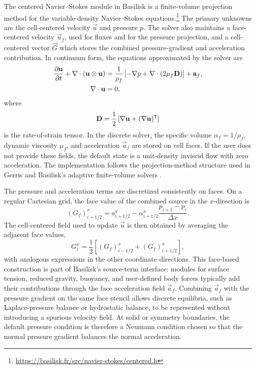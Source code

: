 The centered Navier--Stokes module in Basilisk is a finite-volume projection
method for the variable-density Navier--Stokes
equations.\footnote{\url{https://basilisk.fr/src/navier-stokes/centered.h}} The
primary unknowns are the cell-centered velocity \(\vec u\) and pressure \(p\).
The solver also maintains a face-centered velocity \(\vec u_f\), used for
fluxes and for the pressure projection, and a cell-centered vector \(\vec G\)
which stores the combined pressure-gradient and acceleration contribution. In
continuum form, the equations approximated by the solver are
\begin{align}
    \pdv{\mathbf{u}}{t}
    + \nabla \cdot \left(\mathbf{u} \otimes \mathbf{u}\right)
                        & =
    \frac{1}{\rho_f}
    \left[-\nabla p + \nabla \cdot \left(2\mu_f \mathbf{D}\right)\right]
    + \mathbf{a}_f,
    \label{eq:basilisk-centered-momentum} \\
    \nabla \cdot \mathbf{u} & = 0,
    \label{eq:basilisk-centered-incompressibility}
\end{align}
where
\begin{equation}
    \mathbf{D} = \frac{1}{2}\left[\nabla \mathbf{u}
        + \left(\nabla \mathbf{u}\right)^\intercal\right]
\end{equation}
is the rate-of-strain tensor. In the discrete solver, the specific volume
\(\alpha_f = 1/\rho_f\), dynamic viscosity \(\mu_f\), and acceleration \(\vec a_f\)
are stored on cell faces. If the user does not provide these fields, the
default state is a unit-density inviscid flow with zero acceleration. The
implementation follows the projection-method structure used in Gerris
\cite{popinet_gerris_2003} and Basilisk's adaptive finite-volume solvers
\cite{popinet_quadtree-adaptive_2015}.

The pressure and acceleration terms are discretized consistently on faces. On a
regular Cartesian grid, the face value of the combined source in the
\(x\)-direction is
\begin{equation}
    \left(G_f\right)^x_{i+1/2}
    =
    a^x_{i+1/2}
    - \alpha^x_{i+1/2}\frac{p_{i+1}-p_i}{\Delta x}.
    \label{eq:basilisk-face-gradient}
\end{equation}
The cell-centered field used to update \(\vec u\) is then obtained by
averaging the adjacent face values,
\begin{equation}
    G^x_i =
    \frac{1}{2}
    \left[\left(G_f\right)^x_{i-1/2}
    + \left(G_f\right)^x_{i+1/2}\right],
    \label{eq:basilisk-centered-gradient}
\end{equation}
with analogous expressions in the other coordinate directions. This
face-based construction is part of Basilisk's source-term interface: modules
for surface tension, reduced gravity, buoyancy, and user-defined body forces
typically add their contributions through the face acceleration field
\(\vec a_f\). Combining \(\vec a_f\) with the pressure gradient on the same face
stencil allows discrete equilibria, such as Laplace-pressure balance or
hydrostatic balance, to be represented without introducing a spurious velocity
field. At solid or symmetry boundaries, the default pressure condition is
therefore a Neumann condition chosen so that the normal pressure gradient
balances the normal acceleration.

